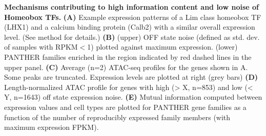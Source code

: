 \textbf{Mechanisms contributing to high information content and low noise of Homeobox TFs.}
\textbf{(A)} Example expression patterns of a Lim class homeobox TF (LHX1) and a calcium binding protein (Calb2) with a similar overall expression level. 
(See method for details.)
\textbf{(B)} (upper) OFF state noise (defined as std. dev. of samples with RPKM$<$1) plotted against maximum expression. (lower) PANTHER families enriched in the region indicated by red dashed lines in the upper panel.
\textbf{(C)} Average (n=2) ATAC-seq profiles for the genes shown in A. Some peaks are truncated. Expression levels are plotted at right (grey bars)
\textbf{(D)} Length-normalized ATAC profile for genes with high (> X, n=853) and low (< Y, n=1643) off state expression noise.
\textbf{(E)} Mutual information computed between expression values and cell types are plotted for PANTHER gene families as a function of the number of reproducibly expressed family members (with maximum expression  FPKM). 
